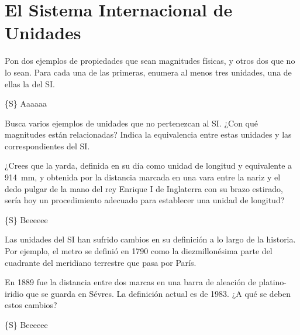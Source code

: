 \hypertarget{el-sistema-internacional-de-unidades}{%
\section{El Sistema Internacional de
Unidades}\label{el-sistema-internacional-de-unidades}}

\begin{exercise}

Pon dos ejemplos de propiedades que sean magnitudes físicas, y otros dos
que no lo sean. Para cada una de las primeras, enumera al menos tres
unidades, una de ellas la del SI.

\{S\} Aaaaaa

\end{exercise}

\begin{exercise}

Busca varios ejemplos de unidades que no pertenezcan al SI. ¿Con qué
magnitudes están relacionadas? Indica la equivalencia entre estas
unidades y las correspondientes del SI.

\end{exercise}

\begin{exercise}

¿Crees que la yarda, definida en su día como unidad de longitud y
equivalente a 914~mm, y obtenida por la distancia marcada en una vara
entre la nariz y el dedo pulgar de la mano del rey Enrique I de
Inglaterra con su brazo estirado, sería hoy un procedimiento adecuado
para establecer una unidad de longitud?

\{S\} Beeeeee

\end{exercise}

\begin{exercise}

Las unidades del SI han sufrido cambios en su definición a lo largo de
la historia. Por ejemplo, el metro se definió en 1790 como la
diezmillonésima parte del cuadrante del meridiano terrestre que pasa por
París.

En 1889 fue la distancia entre dos marcas en una barra de aleación de
platino-iridio que se guarda en Sévres. La definición actual es de 1983.
¿A qué se deben estos cambios?

\{S\} Beeeeee

\end{exercise}
